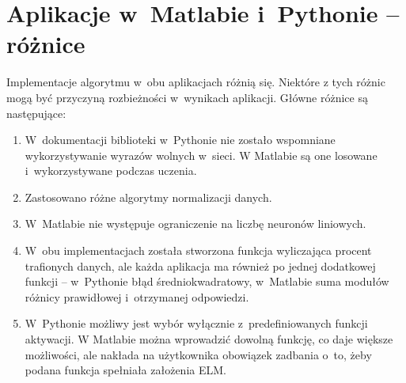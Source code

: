 \documentclass[pl]{minipw} %
\begin{document}
\section{Aplikacje w~Matlabie i~Pythonie -- różnice}
\label{porownanie_aplikacji}
Implementacje algorytmu w~obu aplikacjach różnią się. 
Niektóre z tych różnic mogą być przyczyną rozbieżności w~wynikach aplikacji.
Główne różnice są następujące:
\begin{enumerate}
\item W~dokumentacji biblioteki w~Pythonie nie zostało wspomniane wykorzystywanie wyrazów wolnych w~sieci.
W Matlabie są one losowane i~wykorzystywane podczas uczenia.
\item Zastosowano różne algorytmy normalizacji danych.
\item W~Matlabie nie występuje ograniczenie na liczbę neuronów liniowych.
\item W~obu implementacjach została stworzona funkcja wyliczająca procent trafionych danych, ale każda aplikacja ma również po jednej dodatkowej funkcji -- w~Pythonie błąd średniokwadratowy, w~Matlabie suma modułów różnicy prawidłowej i~otrzymanej odpowiedzi.
\item W~Pythonie możliwy jest wybór wyłącznie z~predefiniowanych funkcji aktywacji. 
W Matlabie można wprowadzić dowolną funkcję, co daje większe możliwości, ale nakłada na użytkownika obowiązek zadbania o~to, żeby podana funkcja spełniała założenia ELM.
\end{enumerate}
\end{document}
